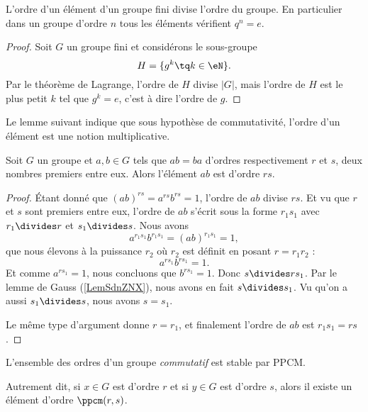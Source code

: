\begin{corollary}       \label{CorpZItFX}
    L'ordre d'un élément d'un groupe fini divise l'ordre du groupe. En particulier dans un groupe d'ordre \( n\) tous les éléments vérifient \( q^n=e\).
\end{corollary}

\begin{proof}
    Soit \( G\) un groupe fini et considérons le sous-groupe
    \begin{equation}
        H=\{ g^k\tq k\in\eN \}.
    \end{equation}
    Par le théorème de Lagrange, l'ordre de \( H\) divise \( | G |\), mais l'ordre de \( H\) est le plus petit \( k\) tel que \( g^k=e\), c'est à dire l'ordre de \( g\).
\end{proof}

Le lemme suivant indique que sous hypothèse de commutativité, l'ordre d'un élément est une notion multiplicative.
\begin{lemma}    \label{LemyETtdy}
    Soit \( G\) un groupe et \( a,b\in G\) tels que \( ab=ba\) d'ordres respectivement \( r\) et \( s\), deux nombres premiers entre eux. Alors l'élément \( ab\) est d'ordre \( rs\).
\end{lemma}

\begin{proof}
    Étant donné que \( (ab)^{rs}=a^{rs}b^{rs}=1\), l'ordre de \( ab\) divise \( rs\). Et vu que \( r\) et \( s\) sont premiers entre eux, l'ordre de \( ab\) s'écrit sous la forme \( r_1s_1\) avec \( r_1\divides r\) et \( s_1\divides s\). Nous avons
    \begin{equation}
        a^{r_1s_1}b^{r_1s_1}=(ab)^{r_1s_1}=1,
    \end{equation}
    que nous élevons à la puissance \( r_2\) où \( r_2\) est définit en posant \(r=r_1r_2\) :
    \begin{equation}
        a^{rs_1}b^{rs_1}=1.
    \end{equation}
    Et comme \( a^{rs_1}=1\), nous concluons que \( b^{rs_1}=1\). Donc \( s\divides rs_1\). Par le lemme de Gauss (\ref{LemSdnZNX}), nous avons en fait \( s\divides s_1\). Vu qu'on a aussi \( s_1\divides s\), nous avons \( s=s_1\).

    Le même type d'argument donne \( r=r_1\), et finalement l'ordre de \( ab\) est \( r_1s_1=rs\).
\end{proof}

\begin{lemma}       \label{LemqAUBYn}
    L'ensemble des ordres d'un groupe \emph{commutatif} est stable par PPCM.

    Autrement dit, si \( x\in G\) est d'ordre \( r\) et si \( y\in G\) est d'ordre \( s\), alors il existe un élément d'ordre \( \ppcm(r,s)\).
\end{lemma}

